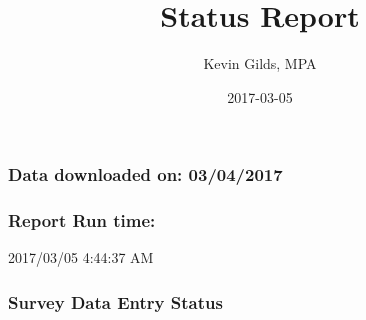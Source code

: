 \documentclass[]{article}
\title{Status Report}
\author{Kevin Gilds, MPA}
\date{2017-03-05}
\newenvironment{Shaded}{\begin{snugshade}}{\end{snugshade}}
\newcommand{\KeywordTok}[1]{\textcolor[rgb]{0.13,0.29,0.53}{\textbf{{#1}}}}
\newcommand{\StringTok}[1]{\textcolor[rgb]{0.31,0.60,0.02}{{#1}}}
\newcommand{\NormalTok}[1]{{#1}}
\begin{document}
\maketitle

\subsubsection{Data downloaded on:
03/04/2017}\label{data-downloaded-on-03042017}

\subsubsection{Report Run time:}\label{report-run-time}

2017/03/05 4:44:37 AM

\subsubsection{Survey Data Entry Status}\label{survey-data-entry-status}

\begin{Shaded}
\end{Shaded}
\end{document}
